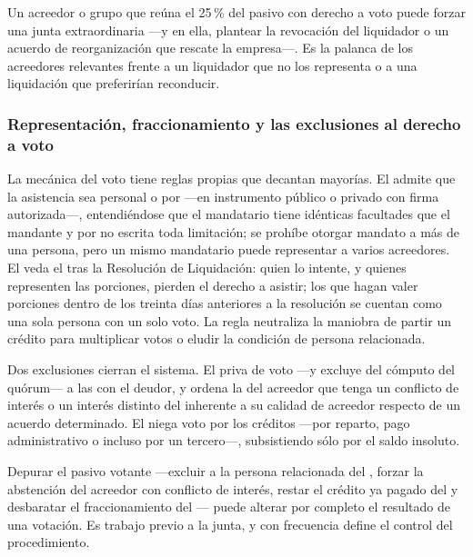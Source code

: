 \begin{foco}
Un acreedor o grupo que reúna el 25\,\% del pasivo con derecho a voto puede forzar una junta
extraordinaria ---y en ella, plantear la revocación del liquidador o un acuerdo de
reorganización que rescate la empresa---. Es la palanca de los acreedores relevantes frente a un
liquidador que no los representa o a una liquidación que preferirían reconducir.
\end{foco}

\subsubsection{Representación, fraccionamiento y las exclusiones al derecho a voto}

La mecánica del voto tiene reglas propias que decantan mayorías. El  admite que la
asistencia sea personal o por  ---en instrumento público o privado con firma
autorizada---, entendiéndose que el mandatario tiene idénticas facultades que el mandante y por no
escrita toda limitación; se prohíbe otorgar mandato a más de una persona, pero un mismo mandatario
puede representar a varios acreedores. El  veda el  tras la Resolución de Liquidación: quien lo intente, y quienes representen las porciones,
pierden el derecho a asistir; los que hagan valer porciones dentro de los treinta días anteriores a
la resolución se cuentan como una sola persona con un solo voto. La regla neutraliza la maniobra de
partir un crédito para multiplicar votos o eludir la condición de persona relacionada.

Dos exclusiones cierran el sistema. El  priva de voto ---y excluye del cómputo del
quórum--- a las  con el deudor, y ordena la 
del acreedor que tenga un conflicto de interés o un interés distinto del inherente a su calidad de
acreedor respecto de un acuerdo determinado. El  niega voto por los créditos
 ---por reparto, pago administrativo o incluso por un tercero---,
subsistiendo sólo por el saldo insoluto.

\begin{alerta}
Depurar el pasivo votante ---excluir a la persona relacionada del , forzar la abstención
del acreedor con conflicto de interés, restar el crédito ya pagado del  y desbaratar el
fraccionamiento del --- puede alterar por completo el resultado de una votación. Es
trabajo previo a la junta, y con frecuencia define el control del procedimiento.
\end{alerta}

